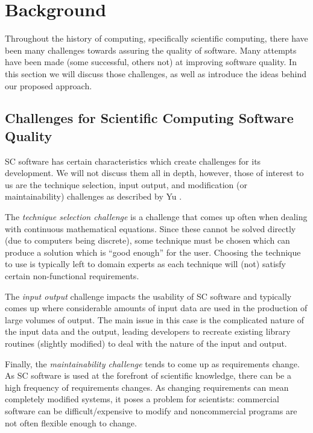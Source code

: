 \documentclass{sig-alternate-05-2015}
\begin{document}
\section{Background} \label{sec:background}

Throughout the history of computing, specifically scientific computing, there
have been many challenges towards assuring the quality of software. Many
attempts have been made (some successful, others not) at improving software
quality. In this section we will discuss those challenges, as well
as introduce the ideas behind our proposed approach.

\subsection{Challenges for Scientific Computing Software Quality} \label{ssec:challenges}

SC software has certain characteristics which create challenges for its
development. We will not discuss them all in depth, however, those of interest
to us are the technique selection, input output, and modification
(or maintainability) challenges as described by Yu \cite{Yu2011}.

The \textit{technique selection challenge} is a challenge that comes up often
when dealing with continuous mathematical equations. Since these cannot be
solved directly (due to computers being discrete), some technique must be chosen
which can produce a solution which is ``good enough'' for the user. Choosing the
technique to use is typically left to domain experts as each technique will
(not) satisfy certain non-functional requirements.

The \textit{input output} challenge impacts the usability of SC software and
typically comes up where considerable amounts of input data are used in the
production of large volumes of output. The main issue in this case is the
complicated nature of the input data and the output, leading developers to
recreate existing library routines (slightly modified) to deal with the
nature of the input and output.

Finally, the \textit{maintainability challenge} tends to come up as requirements
change. As SC software is used at the forefront of scientific knowledge, there
can be a high frequency of requirements changes. As changing requirements can
mean completely modified systems, it poses a problem for scientists: commercial
software can be difficult/expensive to modify and noncommercial programs are not
often flexible enough to change.
\end{document}
